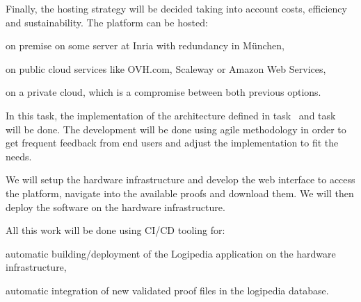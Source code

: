 \begin{workpackage}[id=access,type=RTD,wphases=1-48,
  short=Access,%
  title={Access},
  lead=Inr,InrRM=48,OcaRM=6,EduRM=12]
\begin{tasklist}
{\begin{task}[id=infra,
      title=Defining the hardware architecture for the infrastructure,
      lead=Inr,InrRM=1,wphases=6-7]
    Finally, the hosting strategy will be decided taking into account
    costs, efficiency and sustainability.  The platform can be hosted:
    \begin{compactitem}
    \item on premise on some server at Inria with redundancy in München,
    \item on public cloud services like OVH.com, Scaleway or Amazon
      Web Services,
    \item on a private cloud, which is a compromise between both
      previous options.
    \end{compactitem}
  \end{task}

  \begin{task}[id=web,
      title=Giving access to the infrastructure on the world-wide web,
      lead=Inr,InrRM=18,,wphases=8-27]
    In this task, the implementation of the architecture defined in
    task~ and task~ will
    be done. The development will be done using agile methodology in
    order to get frequent feedback from end users and adjust the
    implementation to fit the needs.

    We will setup the hardware infrastructure and develop the web
    interface to access the platform, navigate into the available
    proofs and download them.  We will then deploy the software on the
    hardware infrastructure.

    All this work will be done using CI/CD tooling for:
    \begin{compactitem}
    \item automatic building/deployment of the Logipedia application
      on the hardware infrastructure,
    \item automatic integration of new validated proof files in the
      logipedia database.
    \end{compactitem}


\end{task}}
\end{tasklist}
\end{workpackage}

